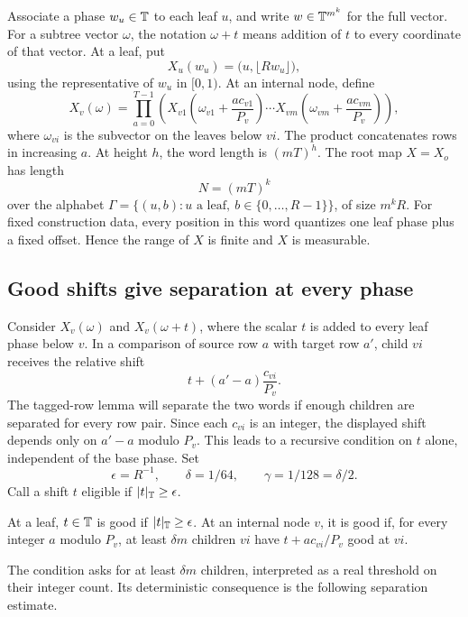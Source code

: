 Associate a phase $w_u\in\mathbb T$ to each leaf $u$, and write
$w\in\mathbb T^{m^k}$ for the full vector. For a subtree vector $\omega$,
the notation $\omega+t$ means addition of $t$ to every coordinate of
that vector. At a leaf, put
\[
 X_u(w_u)=\bigl(u,\lfloor Rw_u\rfloor\bigr),
\]
using the representative of $w_u$ in $[0,1)$. At an internal node,
define
\begin{equation}\label{eq:torus-word}
 X_v(\omega)=\prod_{a=0}^{T-1}
 \left(
 X_{v1}\!\left(\omega_{v1}+\frac{a c_{v1}}{P_v}\right)
 \cdots
 X_{vm}\!\left(\omega_{vm}+\frac{a c_{vm}}{P_v}\right)
 \right),
\end{equation}
where $\omega_{vi}$ is the subvector on the leaves below $vi$.
The product concatenates rows in increasing $a$.
At height $h$, the word length is $(mT)^h$. The root map $X=X_o$ has
length
\begin{equation}\label{eq:torus-length}
 N=(mT)^k
\end{equation}
over the alphabet
$\Gamma=\{(u,b):u\text{ a leaf},\ b\in\{0,\ldots,R-1\}\}$,
of size $m^kR$.
For fixed construction data, every position in this word quantizes one
leaf phase plus a fixed offset. Hence the range of $X$ is finite and
$X$ is measurable.

\subsection{Good shifts give separation at every phase}

Consider $X_v(\omega)$ and $X_v(\omega+t)$, where the scalar $t$ is
added to every leaf phase below $v$. In a comparison of source row
$a$ with target row $a'$, child $vi$ receives the relative shift
\[
 t+(a'-a)\frac{c_{vi}}{P_v}.
\]
The tagged-row lemma will separate the two words if enough children
are separated for every row pair. Since each $c_{vi}$ is an integer,
the displayed shift depends only on $a'-a$ modulo $P_v$. This leads
to a recursive condition on $t$ alone, independent of the base phase.
Set
\[
 \epsilon=R^{-1},\qquad \delta=1/64,\qquad
 \gamma=1/128=\delta/2.
\]
Call a shift $t$ eligible if $|t|_{\mathbb T}\geq\epsilon$.

\begin{definition}\label{def:good}
At a leaf, $t\in\mathbb T$ is good if $|t|_{\mathbb T}\geq\epsilon$.
At an internal node $v$, it is good if, for every integer $a$ modulo
$P_v$, at least $\delta m$ children $vi$ have
$t+a c_{vi}/P_v$ good at $vi$.
\end{definition}

The condition asks for at least $\delta m$ children, interpreted as a
real threshold on their integer count. Its deterministic consequence
is the following separation estimate.

